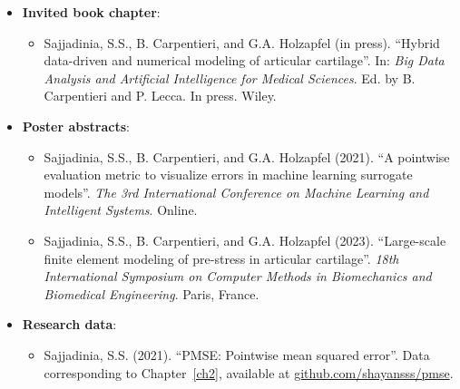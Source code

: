 \documentclass[12pt,a4paper]{report}
\begin{document}
\begin{itemize}
\begin{itemize}
\end{itemize}
\item \textbf{Invited book chapter}:
\begin{itemize}
    \item Sajjadinia, S.S., B. Carpentieri, and G.A. Holzapfel (in press). “Hybrid data-driven and numerical modeling of articular cartilage”. In: \textit{Big Data Analysis and Artificial Intelligence for Medical Sciences}. Ed. by B. Carpentieri and P. Lecca. In press. Wiley.
\end{itemize}
\item \textbf{Poster abstracts}:
\begin{itemize}
    \item Sajjadinia, S.S., B. Carpentieri, and G.A. Holzapfel (2021). “A pointwise evaluation metric to visualize errors in machine learning surrogate models”. \textit{The 3rd International Conference on Machine Learning and Intelligent Systems}. Online.
    \item Sajjadinia, S.S., B. Carpentieri, and G.A. Holzapfel (2023). “Large-scale finite element modeling of pre-stress in articular cartilage”. \textit{18th International Symposium on Computer Methods in Biomechanics and Biomedical Engineering}. Paris, France.
\end{itemize}
\item \textbf{Research data}:
\begin{itemize}
    \item Sajjadinia, S.S. (2021). “PMSE: Pointwise mean squared error”. Data corresponding to Chapter~\ref{ch2}, available at \href{https://github.com/shayansss/pmse}{github.com/shayansss/pmse}.

\end{itemize}
\end{itemize}
\end{document}

